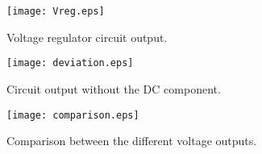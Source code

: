 \begin{figure}[h] \centering
\texttt{[image: Vreg.eps]}
\caption{Voltage regulator circuit output.}
\end{figure}
\begin{figure}[h] \centering
\texttt{[image: deviation.eps]}
\caption{Circuit output without the DC component.}
\end{figure}
\begin{figure}[h] \centering
\texttt{[image: comparison.eps]}
\caption{Comparison between the different voltage outputs.}
\end{figure}
